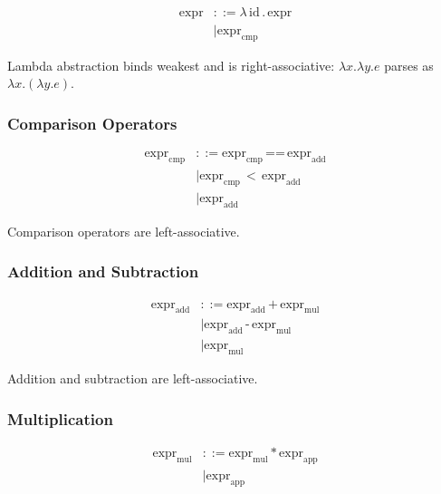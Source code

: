 \documentclass[12pt]{article}
\begin{document}
\begin{align*}
\text{expr} &::= \lambda \, \text{id} \, . \, \text{expr} \\
            &\mid \text{expr}_{\text{cmp}}
\end{align*}

Lambda abstraction binds weakest and is right-associative: $\lambda x. \lambda y. e$ parses as $\lambda x. (\lambda y. e)$.

\subsubsection{Comparison Operators}

\begin{align*}
\text{expr}_{\text{cmp}} &::= \text{expr}_{\text{cmp}} \, \textbf{==} \, \text{expr}_{\text{add}} \\
                         &\mid \text{expr}_{\text{cmp}} \, < \, \text{expr}_{\text{add}} \\
                         &\mid \text{expr}_{\text{add}}
\end{align*}

Comparison operators are left-associative.

\subsubsection{Addition and Subtraction}

\begin{align*}
\text{expr}_{\text{add}} &::= \text{expr}_{\text{add}} \, \textbf{+} \, \text{expr}_{\text{mul}} \\
                         &\mid \text{expr}_{\text{add}} \, \textbf{-} \, \text{expr}_{\text{mul}} \\
                         &\mid \text{expr}_{\text{mul}}
\end{align*}

Addition and subtraction are left-associative.

\subsubsection{Multiplication}

\begin{align*}
\text{expr}_{\text{mul}} &::= \text{expr}_{\text{mul}} \, \textbf{*} \, \text{expr}_{\text{app}} \\
                         &\mid \text{expr}_{\text{app}}
\end{align*}
\end{document}
